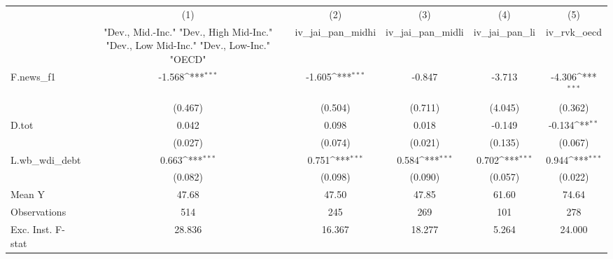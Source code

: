 {
\def\sym#1{\ifmmode^{#1}\else\(^{#1}\)\fi}
\begin{tabular}{l*{5}{c}}
\toprule
            &\multicolumn{1}{c}{(1)}&\multicolumn{1}{c}{(2)}&\multicolumn{1}{c}{(3)}&\multicolumn{1}{c}{(4)}&\multicolumn{1}{c}{(5)}\\
            &\multicolumn{1}{c}{ "Dev., Mid.-Inc." "Dev., High Mid-Inc." "Dev., Low Mid-Inc." "Dev., Low-Inc." "OECD" }&\multicolumn{1}{c}{iv\_jai\_pan\_midhi}&\multicolumn{1}{c}{iv\_jai\_pan\_midli}&\multicolumn{1}{c}{iv\_jai\_pan\_li}&\multicolumn{1}{c}{iv\_rvk\_oecd}\\
\midrule
F.news\_f1   &      -1.568\sym{***}&      -1.605\sym{***}&      -0.847         &      -3.713         &      -4.306\sym{***}\\
            &     (0.467)         &     (0.504)         &     (0.711)         &     (4.045)         &     (0.362)         \\
\addlinespace
D.tot       &       0.042         &       0.098         &       0.018         &      -0.149         &      -0.134\sym{**} \\
            &     (0.027)         &     (0.074)         &     (0.021)         &     (0.135)         &     (0.067)         \\
\addlinespace
L.wb\_wdi\_debt&       0.663\sym{***}&       0.751\sym{***}&       0.584\sym{***}&       0.702\sym{***}&       0.944\sym{***}\\
            &     (0.082)         &     (0.098)         &     (0.090)         &     (0.057)         &     (0.022)         \\
\midrule
Mean Y      &       47.68         &       47.50         &       47.85         &       61.60         &       74.64         \\
Observations&         514         &         245         &         269         &         101         &         278         \\
Exc. Inst. F-stat&      28.836         &      16.367         &      18.277         &       5.264         &      24.000         \\
\bottomrule
\end{tabular}
}
